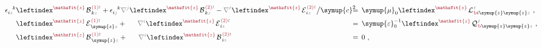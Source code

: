 \begin{subequations}
\begin{align}
	&\hspace{1.0em} \epsilon^{\hphantom{ij}k}_{i\mathcolor{gray}{z}} \leftindex^{\textcolor{Maroon}{\mathsfit{z}}} \;\! {\mathcal{B}}^{\;\!\textcolor{Maroon}{(1)}\mathcolor{gray}{t}}_{\;\! k\mathcolor{gray}{z}} + \epsilon^{\hphantom{ij}k}_{i\mathcolor{gray}{j}} \mathcolor{gray}{\nabla^j} \leftindex^{\textcolor{Maroon}{\mathsfit{z}}} \;\!
	{\mathcal{B}}^{\;\!\textcolor{Maroon}{(2)}\mathcolor{gray}{t}}_{\;\! k\mathcolor{gray}{z}} - \mathcolor{gray}{\nabla^t} \leftindex^{\textcolor{Maroon}{\mathsfit{z}}} \;\!
	{\mathcal{E}}^{\;\!\textcolor{Maroon}{(2)}\mathcolor{gray}{t}}_{\;\! i\mathcolor{gray}{z}} \big/ {\symup{c}}^2 \hspace{-1.7em}&&=\hspace{0.2em} {\symup{\mu}}_0 \leftindex^{\textcolor{Maroon}{\mathsfit{z}}} \;\! {\mathcal{L}}^{\;\!\mathcolor{gray}{t}}_{\;\!\textcolor{Maroon}{\text{b}} i\symup{z} \symup{z} \mathcolor{gray}{z}}~, \hspace{-2.5em} &&\hspace{-1.3em} \label{eq:curl-EB-01-delta'2} \\
	&\hspace{1.0em} \hphantom{\epsilon^{\hphantom{ij}k}_{i\mathcolor{gray}{z}}} \leftindex^{\textcolor{Maroon}{\mathsfit{z}}} \;\! {\mathcal{E}}^{\;\!\textcolor{Maroon}{(1)}\mathcolor{gray}{t}}_{\;\! \symup{z} \mathcolor{gray}{z}} + \hphantom{\epsilon^{\hphantom{ij}k}_{i\mathcolor{gray}{j}}} \mathcolor{gray}{\nabla^i} \leftindex^{\textcolor{Maroon}{\mathsfit{z}}} \;\!
	{\mathcal{E}}^{\;\!\textcolor{Maroon}{(2)}\mathcolor{gray}{t}}_{\;\! i\mathcolor{gray}{z}} \hspace{-1.7em}&&=\hspace{0.2em} {\symup{\varepsilon}}_0^{-1} \leftindex^{\textcolor{Maroon}{\mathsfit{z}}} \;\! {\mathcal{Q}}^{\;\!\mathcolor{gray}{t}}_{\;\!\textcolor{Maroon}{\text{b}} \symup{z} \symup{z} \mathcolor{gray}{z}}~, \hspace{-2.5em} &&\hspace{-1.3em} \label{eq:curl-EB-01-delta'3} \\ 
	&\hspace{1.0em} \hphantom{\epsilon^{\hphantom{ij}k}_{i\mathcolor{gray}{z}}} \leftindex^{\textcolor{Maroon}{\mathsfit{z}}} \;\! {\mathcal{B}}^{\;\!\textcolor{Maroon}{(1)}\mathcolor{gray}{t}}_{\;\! \symup{z} \mathcolor{gray}{z}} + \hphantom{\epsilon^{\hphantom{ij}k}_{i\mathcolor{gray}{j}}} \mathcolor{gray}{\nabla^i} \leftindex^{\textcolor{Maroon}{\mathsfit{z}}} \;\!
	{\mathcal{B}}^{\;\!\textcolor{Maroon}{(2)}\mathcolor{gray}{t}}_{\;\! i\mathcolor{gray}{z}} \hspace{-1.7em}&&=\hspace{0.2em} 0~, \hspace{-2.5em} &&\hspace{-1.3em} \label{eq:curl-EB-01-delta'4} \\

\end{align}
\end{subequations}
